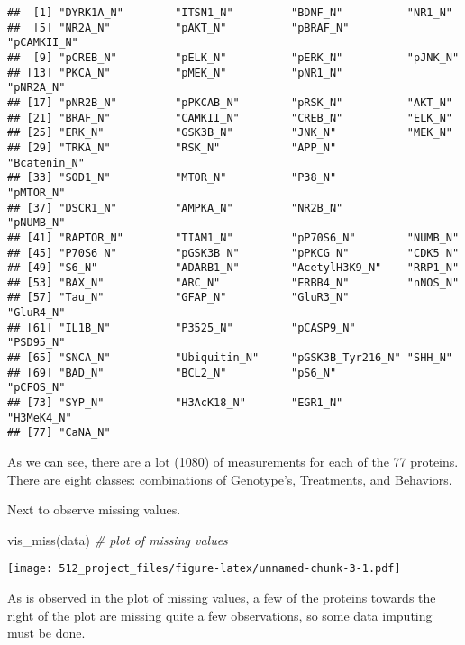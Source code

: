 \documentclass[
]{article}
\newenvironment{Shaded}{\begin{snugshade}}{\end{snugshade}}
\newcommand{\CommentTok}[1]{\textcolor[rgb]{0.56,0.35,0.01}{\textit{#1}}}
\newcommand{\FunctionTok}[1]{\textcolor[rgb]{0.00,0.00,0.00}{#1}}
\newcommand{\NormalTok}[1]{#1}
\begin{document}
\begin{verbatim}
##  [1] "DYRK1A_N"        "ITSN1_N"         "BDNF_N"          "NR1_N"          
##  [5] "NR2A_N"          "pAKT_N"          "pBRAF_N"         "pCAMKII_N"      
##  [9] "pCREB_N"         "pELK_N"          "pERK_N"          "pJNK_N"         
## [13] "PKCA_N"          "pMEK_N"          "pNR1_N"          "pNR2A_N"        
## [17] "pNR2B_N"         "pPKCAB_N"        "pRSK_N"          "AKT_N"          
## [21] "BRAF_N"          "CAMKII_N"        "CREB_N"          "ELK_N"          
## [25] "ERK_N"           "GSK3B_N"         "JNK_N"           "MEK_N"          
## [29] "TRKA_N"          "RSK_N"           "APP_N"           "Bcatenin_N"     
## [33] "SOD1_N"          "MTOR_N"          "P38_N"           "pMTOR_N"        
## [37] "DSCR1_N"         "AMPKA_N"         "NR2B_N"          "pNUMB_N"        
## [41] "RAPTOR_N"        "TIAM1_N"         "pP70S6_N"        "NUMB_N"         
## [45] "P70S6_N"         "pGSK3B_N"        "pPKCG_N"         "CDK5_N"         
## [49] "S6_N"            "ADARB1_N"        "AcetylH3K9_N"    "RRP1_N"         
## [53] "BAX_N"           "ARC_N"           "ERBB4_N"         "nNOS_N"         
## [57] "Tau_N"           "GFAP_N"          "GluR3_N"         "GluR4_N"        
## [61] "IL1B_N"          "P3525_N"         "pCASP9_N"        "PSD95_N"        
## [65] "SNCA_N"          "Ubiquitin_N"     "pGSK3B_Tyr216_N" "SHH_N"          
## [69] "BAD_N"           "BCL2_N"          "pS6_N"           "pCFOS_N"        
## [73] "SYP_N"           "H3AcK18_N"       "EGR1_N"          "H3MeK4_N"       
## [77] "CaNA_N"
\end{verbatim}

As we can see, there are a lot (1080) of measurements for each of the 77
proteins. There are eight classes: combinations of Genotype's,
Treatments, and Behaviors.

Next to observe missing values.

\begin{Shaded}
\begin{Highlighting}[]
\FunctionTok{vis\_miss}\NormalTok{(data) }\CommentTok{\# plot of missing values}
\end{Highlighting}
\end{Shaded}

\texttt{[image: 512\_project\_files/figure-latex/unnamed-chunk-3-1.pdf]}

As is observed in the plot of missing values, a few of the proteins
towards the right of the plot are missing quite a few observations, so
some data imputing must be done.
\end{document}
